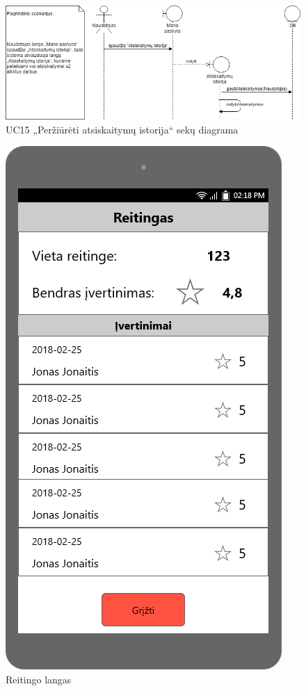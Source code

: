 \documentclass{VUMIFPSbakalaurinis}
\begin{document}
\begin{figure}[H]
	\centering
	\includegraphics[scale=0.6]{img/Sequence/SD15}
	\caption{UC15 „Peržiūrėti atsiskaitymų istorija“ sekų diagrama}
	\label{img:uc15seq}
\end{figure}

\begin{figure}[H]
	\centering
	\includegraphics[scale=0.4]{img/ScreenShots/Mano_profilis/06-Reitingas}
	\caption{Reitingo langas}
	\label{img:rating}
\end{figure}
\end{document}
